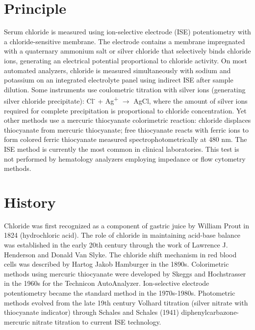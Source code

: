 \section*{Principle}
Serum chloride is measured using ion-selective electrode (ISE) potentiometry with a chloride-sensitive membrane. The electrode contains a membrane impregnated with a quaternary ammonium salt or silver chloride that selectively binds chloride ions, generating an electrical potential proportional to chloride activity. On most automated analyzers, chloride is measured simultaneously with sodium and potassium on an integrated electrolyte panel using indirect ISE after sample dilution. Some instruments use coulometric titration with silver ions (generating silver chloride precipitate): Cl\textsuperscript{-} + Ag\textsuperscript{+} $\rightarrow$ AgCl, where the amount of silver ions required for complete precipitation is proportional to chloride concentration. Yet other methods use a mercuric thiocyanate colorimetric reaction: chloride displaces thiocyanate from mercuric thiocyanate; free thiocyanate reacts with ferric ions to form colored ferric thiocyanate measured spectrophotometrically at 480 nm. The ISE method is currently the most common in clinical laboratories. This test is not performed by hematology analyzers employing impedance or flow cytometry methods.

\section*{History}
Chloride was first recognized as a component of gastric juice by William Prout in 1824 (hydrochloric acid). The role of chloride in maintaining acid-base balance was established in the early 20th century through the work of Lawrence J. Henderson and Donald Van Slyke. The chloride shift mechanism in red blood cells was described by Hartog Jakob Hamburger in the 1890s. Colorimetric methods using mercuric thiocyanate were developed by Skeggs and Hochstrasser in the 1960s for the Technicon AutoAnalyzer. Ion-selective electrode potentiometry became the standard method in the 1970s-1980s. Photometric methods evolved from the late 19th century Volhard titration (silver nitrate with thiocyanate indicator) through Schales and Schales (1941) diphenylcarbazone-mercuric nitrate titration to current ISE technology.

